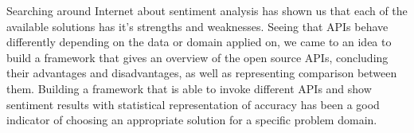 Searching around Internet about sentiment analysis has shown us that each of the available solutions has it’s strengths and weaknesses. Seeing that APIs behave differently depending on the data or domain applied on, we came to an idea to build a framework that gives an overview of the open source APIs, concluding their advantages and disadvantages, as well as representing comparison between them. Building a framework that is able to invoke different APIs and show sentiment results with statistical representation of accuracy has been a good indicator of choosing an appropriate solution for a specific problem domain.  


